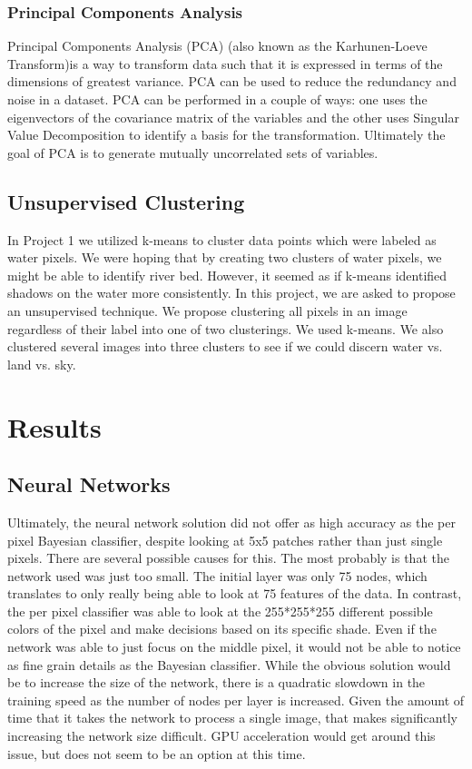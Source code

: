 \documentclass[12pt]{article}
\begin{document}
	\subsubsection{Principal Components Analysis}
	Principal Components Analysis (PCA) (also known as the Karhunen-Loeve Transform)is a way to transform data such that it is expressed in terms of the dimensions of greatest variance\cite{Shlens2003pca}. PCA can be used to reduce the redundancy and noise in a dataset. PCA can be performed in a couple of ways: one uses the eigenvectors of the covariance matrix of the variables and the other uses Singular Value Decomposition to identify a basis for the transformation. Ultimately the goal of PCA is to generate mutually uncorrelated sets of variables\cite{theodoridis2009pattern}.
	\subsection{Unsupervised Clustering}
	In Project 1 we utilized k-means to cluster data points which were labeled as water pixels. We were hoping that by creating two clusters of water pixels, we might be able to identify river bed. However, it seemed as if k-means identified shadows on the water more consistently.  In this project, we are asked to propose an unsupervised technique. We propose clustering all pixels in an image regardless of their label into one of two clusterings. We used k-means. We also clustered several images into three clusters to see if we could discern water vs. land vs. sky.  
	
	
\section{Results}
	\subsection{Neural Networks}
	Ultimately, the neural network solution did not offer as high accuracy as the per pixel Bayesian classifier, despite looking at 5x5 patches rather than just single pixels.  There are several possible causes for this.  The most probably is that the network used was just too small.  The initial layer was only 75 nodes, which translates to only really being able to look at 75 features of the data.  In contrast, the per pixel classifier was able to look at the 255*255*255 different possible colors of the pixel and make decisions based on its specific shade.  Even if the network was able to just focus on the middle pixel, it would not be able to notice as fine grain details as the Bayesian classifier.  While the obvious solution would be to increase the size of the network, there is a quadratic slowdown in the training speed as the number of nodes per layer is increased.  Given the amount of time that it takes the network to process a single image, that makes significantly increasing the network size difficult.  GPU acceleration would get around this issue, but does not seem to be an option at this time.
\end{document}
